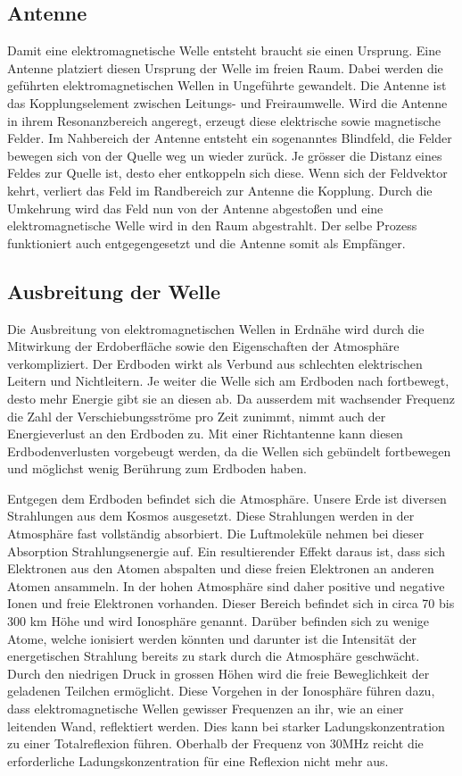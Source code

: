 \begin{refsection}
\subsection{Antenne}
Damit eine elektromagnetische Welle entsteht braucht sie einen Ursprung.
Eine Antenne platziert diesen Ursprung der Welle im freien Raum.
Dabei werden die geführten elektromagnetischen Wellen in Ungeführte gewandelt.
Die Antenne ist das Kopplungselement zwischen Leitungs- und Freiraumwelle.
Wird die Antenne in ihrem Resonanzbereich angeregt, erzeugt diese elektrische sowie magnetische Felder.
Im Nahbereich der Antenne entsteht ein sogenanntes Blindfeld, die Felder bewegen sich von der Quelle weg un wieder zurück.
Je grösser die Distanz eines Feldes zur Quelle ist, desto eher entkoppeln sich diese.
Wenn sich der Feldvektor kehrt, verliert das Feld im Randbereich zur Antenne die Kopplung.
Durch die Umkehrung wird das Feld nun von der Antenne abgestoßen und eine elektromagnetische Welle wird in den Raum abgestrahlt.
Der selbe Prozess funktioniert auch entgegengesetzt und die Antenne somit als Empfänger.\cite{buch:unger}

\subsection{Ausbreitung der Welle}
Die Ausbreitung von elektromagnetischen Wellen in Erdnähe wird durch die Mitwirkung der Erdoberfläche sowie den Eigenschaften der Atmosphäre verkompliziert.
Der Erdboden wirkt als Verbund aus schlechten elektrischen Leitern und Nichtleitern. 
Je weiter die Welle sich am Erdboden nach fortbewegt, desto mehr Energie gibt sie an diesen ab.
Da ausserdem mit wachsender Frequenz die Zahl der Verschiebungsströme pro Zeit zunimmt, nimmt auch der Energieverlust an den Erdboden zu.
Mit einer Richtantenne kann diesen Erdbodenverlusten vorgebeugt werden, da die Wellen sich gebündelt fortbewegen und möglichst wenig Berührung zum Erdboden haben.

Entgegen dem Erdboden befindet sich die Atmosphäre.
Unsere Erde ist diversen Strahlungen aus dem Kosmos ausgesetzt.
Diese Strahlungen werden in der Atmosphäre fast vollständig absorbiert.
Die Luftmoleküle nehmen bei dieser Absorption Strahlungsenergie auf.
Ein resultierender Effekt daraus ist, dass sich Elektronen aus den Atomen abspalten und diese freien Elektronen an anderen Atomen ansammeln.
In der hohen Atmosphäre sind daher positive und negative Ionen und freie Elektronen vorhanden.
Dieser Bereich befindet sich in circa 70 bis 300 km Höhe und wird Ionosphäre genannt.
Darüber befinden sich zu wenige Atome, welche ionisiert werden könnten und darunter ist die Intensität der energetischen Strahlung bereits zu stark durch die Atmosphäre geschwächt.
Durch den niedrigen Druck in grossen Höhen wird die freie Beweglichkeit der geladenen Teilchen ermöglicht.
Diese Vorgehen in der Ionosphäre führen dazu, dass elektromagnetische Wellen gewisser Frequenzen an ihr, wie an einer leitenden Wand, reflektiert werden.
Dies kann bei starker Ladungskonzentration zu einer Totalreflexion führen. 
Oberhalb der Frequenz von 30MHz reicht die erforderliche Ladungskonzentration für eine Reflexion nicht mehr aus.\cite{buch:meinke} 



\end{refsection}
